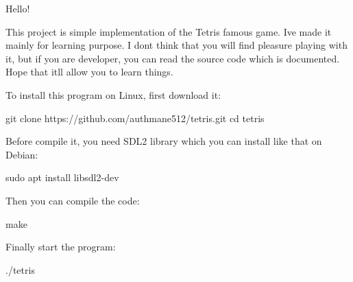 Hello!

This project is simple implementation of the Tetris famous game. I\textquotesingle{}ve made it mainly for learning purpose. I don\textquotesingle{}t think that you will find pleasure playing with it, but if you are developer, you can read the source code which is documented. Hope that it\textquotesingle{}ll allow you to learn things.

To install this program on Linux, first download it\+: 
\begin{DoxyCode}
git clone https://github.com/authmane512/tetris.git
cd tetris
\end{DoxyCode}


Before compile it, you need S\+D\+L2 library which you can install like that on Debian\+: 
\begin{DoxyCode}
sudo apt install libsdl2-dev
\end{DoxyCode}


Then you can compile the code\+: 
\begin{DoxyCode}
make
\end{DoxyCode}


Finally start the program\+: 
\begin{DoxyCode}
./tetris
\end{DoxyCode}
 